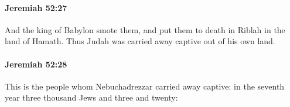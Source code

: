 		\paragraph{Jeremiah 52:27} %
			\label{JEREMIAH-52-27}

			And the king of Babylon smote them, and put them to death in Riblah in the land of Hamath. Thus Judah was carried away captive out of his own land.


		\paragraph{Jeremiah 52:28} %
			\label{JEREMIAH-52-28}

			This is the people whom Nebuchadrezzar carried away captive: in the seventh year three thousand Jews and three and twenty:


